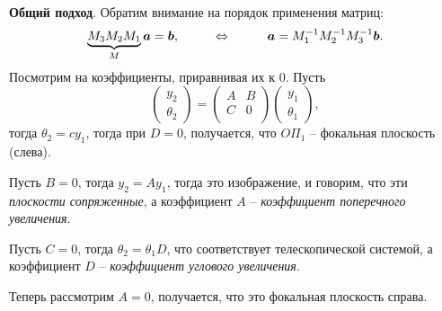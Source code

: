\textbf{Общий подход}. 
Обратим внимание на порядок применения матриц: 
\begin{equation*}
    \underbrace{M_3 M_2 M_1}_{M} \mbox{\boldmath $a$} = \mbox{\boldmath $b$},
    \hspace{1 cm}
    \Leftrightarrow
    \hspace{1 cm}
    \mbox{\boldmath $a$} = M_1^{-1} M_2^{-1} M_3^{-1} \mbox{\boldmath $b$}.
\end{equation*}
Посмотрим на коэффициенты, приравнивая их к 0. Пусть 
\begin{equation*}
    \begin{pmatrix}
        y_2 \\ \theta_2
    \end{pmatrix} = 
    \begin{pmatrix}
        A & B \\
        C & 0 \\
    \end{pmatrix}
    \begin{pmatrix}
        y_1 \\ \theta_1
    \end{pmatrix},
\end{equation*}
тогда $\theta_2 = c y_1$, тогда при $D=0$,  получается, что $O\Pi_1$ -- фокальная плоскость (слева).

Пусть $B=0$, тогда $y_2 = A y_1$, тогда это изображение, и говорим, что эти \textit{плоскости сопряженные}, а коэффициент $A$ -- \textit{коэффициент поперечного увеличения}. 

Пусть $C=0$, тогда $\theta_2 = \theta_1 D$, что соответствует телескопической системой, а коэффициент $D$ -- \textit{коэффициент углового увеличения}.

Теперь рассмотрим $A = 0$, получается, что это фокальная плоскость справа. 



